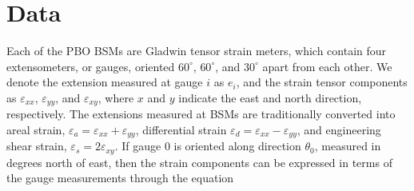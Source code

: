 \documentclass[10pt,a4paper]{article}
\begin{document}
\section{Data}
Each of the PBO BSMs are Gladwin tensor strain meters, which contain four extensometers, or gauges, oriented $60^\circ$, $60^\circ$, and $30^\circ$ apart from each other. We denote the extension measured at gauge $i$ as $e_i$, and the strain tensor components as $\varepsilon_{xx}$, $\varepsilon_{yy}$, and $\varepsilon_{xy}$, where $x$ and $y$ indicate the east and north direction, respectively. The extensions measured at BSMs are traditionally converted into areal strain, $\varepsilon_a = \varepsilon_{xx} + \varepsilon_{yy}$, differential strain $\varepsilon_d = \varepsilon_{xx} - \varepsilon_{yy}$, and engineering shear strain, $\varepsilon_s = 2\varepsilon_{xy}$. If gauge 0 is oriented along direction $\theta_0$, measured in degrees north of east, then the strain components can be expressed in terms of the gauge measurements through the equation 
\end{document}
